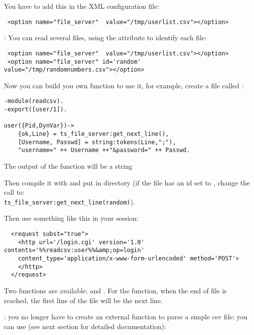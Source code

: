 \documentclass{TSUNG-en}
\begin{document}
You have to add this in the XML configuration file:
\begin{Verbatim}
 <option name="file_server"  value="/tmp/userlist.csv"></option>
\end{Verbatim}

: You can read several files, using the 
attribute to identify each file:
\begin{Verbatim}
 <option name="file_server"  value="/tmp/userlist.csv"></option>
 <option name="file_server" id='random' value="/tmp/randomnumbers.csv"></option>
\end{Verbatim}

Now you can build you own function to use it, for example, create a
file called :

\begin{Verbatim}
-module(readcsv).
-export([user/1]).

user({Pid,DynVar})->
    {ok,Line} = ts_file_server:get_next_line(),
    [Username, Passwd] = string:tokens(Line,";"),
    "username=" ++ Username ++"&password=" ++ Passwd.
\end{Verbatim}

The output of the function will be a string 

Then compile it with  and put
 in
 directory  (if the
file has an id set to , change the call to: \\
\texttt{ts\_file\_server:get\_next\_line(random)}).

Then use something like this in your session:

\begin{Verbatim}
  <request subst="true">
    <http url='/login.cgi' version='1.0' contents='%%readcsv:user%%&amp;op=login'
    content_type='application/x-www-form-urlencoded' method='POST'>
    </http>
  </request>
\end{Verbatim}

Two functions are available: 
and . For the
 function, when the end of file is reached, the
first line of the file will be the next line.

: you no longer have to create an external
function to parse a simple csv file: you can use 
(see next section for detailed documentation):
\end{document}
